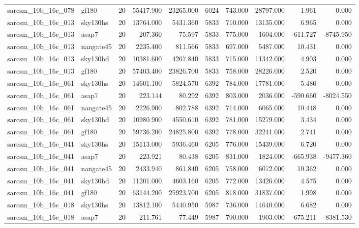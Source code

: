 \begin{tabular}{llrrrrrrrr}
sarcsm\_10b\_16c\_078 & gf180 & 20 & 55417.900 & 23265.000 & 6024 & 743.000 & 28797.000 & 1.961 & 0.000 \\
sarcsm\_10b\_16c\_013 & sky130hs & 20 & 13764.000 & 5431.360 & 5833 & 710.000 & 13135.000 & 6.965 & 0.000 \\
sarcsm\_10b\_16c\_013 & asap7 & 20 & 207.360 & 75.597 & 5833 & 775.000 & 1604.000 & -611.727 & -8745.950 \\
sarcsm\_10b\_16c\_013 & nangate45 & 20 & 2235.400 & 811.566 & 5833 & 697.000 & 5487.000 & 10.431 & 0.000 \\
sarcsm\_10b\_16c\_013 & sky130hd & 20 & 10381.600 & 4267.840 & 5833 & 715.000 & 11342.000 & 4.903 & 0.000 \\
sarcsm\_10b\_16c\_013 & gf180 & 20 & 57403.400 & 23826.700 & 5833 & 758.000 & 28226.000 & 2.520 & 0.000 \\
sarcsm\_10b\_16c\_061 & sky130hs & 20 & 14601.100 & 5824.570 & 6392 & 784.000 & 17781.000 & 5.480 & 0.000 \\
sarcsm\_10b\_16c\_061 & asap7 & 20 & 223.144 & 80.292 & 6392 & 803.000 & 2036.000 & -590.660 & -8024.550 \\
sarcsm\_10b\_16c\_061 & nangate45 & 20 & 2226.900 & 802.788 & 6392 & 714.000 & 6065.000 & 10.448 & 0.000 \\
sarcsm\_10b\_16c\_061 & sky130hd & 20 & 10980.900 & 4550.610 & 6392 & 781.000 & 15279.000 & 3.434 & 0.000 \\
sarcsm\_10b\_16c\_061 & gf180 & 20 & 59736.200 & 24825.800 & 6392 & 778.000 & 32241.000 & 2.741 & 0.000 \\
sarcsm\_10b\_16c\_041 & sky130hs & 20 & 15113.000 & 5936.460 & 6205 & 776.000 & 15439.000 & 6.720 & 0.000 \\
sarcsm\_10b\_16c\_041 & asap7 & 20 & 223.921 & 80.438 & 6205 & 831.000 & 1824.000 & -665.938 & -9477.360 \\
sarcsm\_10b\_16c\_041 & nangate45 & 20 & 2433.940 & 861.840 & 6205 & 758.000 & 6072.000 & 10.362 & 0.000 \\
sarcsm\_10b\_16c\_041 & sky130hd & 20 & 11201.000 & 4603.160 & 6205 & 772.000 & 13426.000 & 4.575 & 0.000 \\
sarcsm\_10b\_16c\_041 & gf180 & 20 & 63144.200 & 25923.700 & 6205 & 818.000 & 31837.000 & 1.998 & 0.000 \\
sarcsm\_10b\_16c\_018 & sky130hs & 20 & 13812.100 & 5440.950 & 5987 & 736.000 & 14640.000 & 6.682 & 0.000 \\
sarcsm\_10b\_16c\_018 & asap7 & 20 & 211.761 & 77.449 & 5987 & 790.000 & 1903.000 & -675.211 & -8381.530 \\

\end{tabular}
